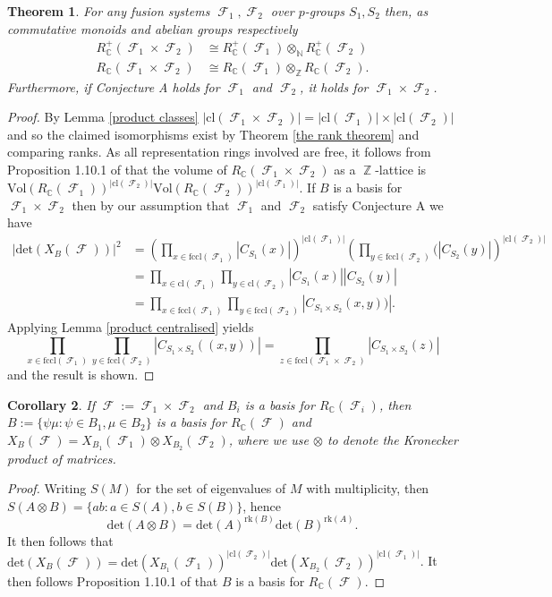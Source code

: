 \documentclass[12pt]{article}
\DeclareMathOperator{\C}{\mathbb{C}}
\DeclareMathOperator{\Z}{\mathbb{Z}}
\DeclareMathOperator{\sF}{\mathcal{F}}
\theoremstyle{plain}
\newcounter{thmsection}
\newtheorem{thm}{Theorem}[thmsection]
\newtheorem{cor}[thm]{Corollary}
\theoremstyle{definition}
\begin{document}
\begin{thm}\label{min counter-example}
For any fusion systems $\sF_1, \sF_2$ over $p$-groups $S_1, S_2$ then, as commutative monoids and abelian groups respectively
\begin{align*}R_{\C}^+(\sF_1 \times \sF_2) &\cong R_{\C}^+(\sF_1) \otimes_{\mathbb{N}} R_{\C}^+(\sF_2) \\
R_{\C}(\sF_1 \times \sF_2) &\cong R_{\C}(\sF_1) \otimes_{\Z} R_{\C}(\sF_2).
\end{align*}
Furthermore, if Conjecture A holds for $\sF_1$ and $\sF_2$, it holds for $\sF_1 \times \sF_2$.
\end{thm}
\begin{proof}
By Lemma \ref{product classes} $|\text{cl}(\sF_1 \times \sF_2)| = |\text{cl}(\sF_1)| \times |\text{cl}(\sF_2)|$ and so the claimed isomorphisms exist by Theorem \ref{the rank theorem} and comparing ranks. As all representation rings involved are free, it follows from Proposition 1.10.1 of \cite{martinet} that the volume of $R_{\C}(\sF_1 \times \sF_2)$ as a $\Z$-lattice is $\text{Vol}(R_{\C}(\sF_1))^{|\text{cl}(\sF_2)|}\text{Vol}(R_{\C}(\sF_2))^{|\text{cl}(\sF_1)|}$. If $B$ is a basis for $\sF_1 \times \sF_2$ then by our assumption that  $\sF_1$ and $\sF_2$ satisfy Conjecture A we have
\begin{align*}|\mathrm{det}(X_{B}(\sF))|^2 &= \left(\prod_{x \in \text{fccl}(\sF_1)} |C_{S_1}(x)|\right)^{|\text{cl}(\sF_1)|}\left(\prod_{y \in \text{fccl}(\sF_2)}(|C_{S_2}(y)|\right)^{|\text{cl}(\sF_2)|} 
\\ &= \prod_{x \in \text{cl}(\sF_1)}\prod_{y \in \text{cl}(\sF_2)}|C_{S_1}(x)||C_{S_2}(y)| \\ &= \prod_{x \in \text{fccl}(\sF_1)}\prod_{y \in \text{fccl}(\sF_2)}|C_{S_1 \times S_2}(x, y))|.
\end{align*}
Applying Lemma \ref{product centralised} yields
\[\prod_{x \in \text{fccl}(\sF_1)}\prod_{y \in \text{fccl}(\sF_2)}|C_{S_1 \times S_2}((x, y))| = \prod_{z \in \text{fccl}(\sF_1 \times \sF_2)}|C_{S_1 \times S_2}(z)|\]
and the result is shown.
\end{proof}
\begin{cor}
If $\sF := \sF_1 \times \sF_2$ and $B_i$ is a basis for $R_{\C}(\sF_i)$, then $B :=  \{\psi\mu \colon \psi \in B_1, \mu \in B_2\}$ is a basis for $R_{\C}(\sF)$ and $X_{B}(\sF) = X_{B_1}(\sF_1) \otimes X_{B_2}(\sF_2)$, where we use $\otimes$ to denote the Kronecker product of matrices.
\end{cor}
\begin{proof}
Writing $S(M)$ for the set of eigenvalues of $M$ with multiplicity, then $S(A \otimes B) = \{ab \colon a \in S(A), b \in S(B)\}$, hence
\[\text{det}(A \otimes B) = \text{det}(A)^{\text{rk}(B)}\text{det}(B)^{\text{rk}(A)}.\]
It then follows that $\text{det}(X_B(\sF)) = \text{det}(X_{B_1}(\sF_1))^{|\text{cl}(\sF_2)|}\text{det}(X_{B_2}(\sF_2))^{|\text{cl}(\sF_1)|}$. It then follows Proposition 1.10.1 of \cite{martinet} that $B$ is a basis for $R_{\C}(\sF)$.
\end{proof}
\end{document}
